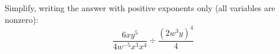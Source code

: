 Simplify, writing the answer with positive exponents only (all variables are nonzero):
\[
\dfrac{6xy^5}{4w^{-5}x^3x^4}\div\dfrac{(2w^3y)^4}{4}
\]
